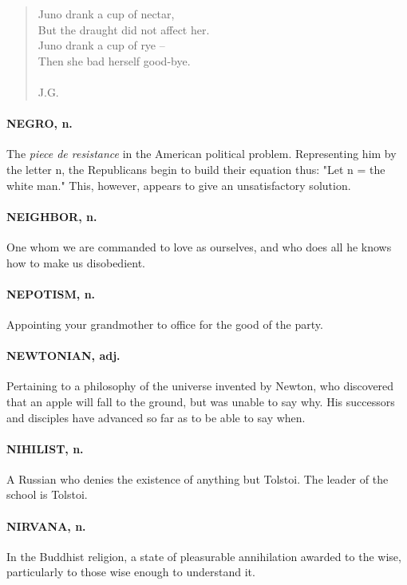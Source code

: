 \documentclass[11pt]{article}
\begin{document}
\begin{quote}   Juno drank a cup of nectar, \\
  But the draught did not affect her. \\
  Juno drank a cup of rye -- \\
  Then she bad herself good-bye. \\
 \\
J.G. \end{quote}


\paragraph{NEGRO, n.}  The {\em piece de resistance} in the American political
problem.  Representing him by the letter n, the Republicans begin to
build their equation thus:  "Let n = the white man."  This, however,
appears to give an unsatisfactory solution.

\paragraph{NEIGHBOR, n.}  One whom we are commanded to love as ourselves, and who
does all he knows how to make us disobedient.

\paragraph{NEPOTISM, n.}  Appointing your grandmother to office for the good of
the party.

\paragraph{NEWTONIAN, adj.}  Pertaining to a philosophy of the universe invented
by Newton, who discovered that an apple will fall to the ground, but
was unable to say why.  His successors and disciples have advanced so
far as to be able to say when.

\paragraph{NIHILIST, n.}  A Russian who denies the existence of anything but
Tolstoi.  The leader of the school is Tolstoi.

\paragraph{NIRVANA, n.}  In the Buddhist religion, a state of pleasurable
annihilation awarded to the wise, particularly to those wise enough to
understand it.
\end{document}
